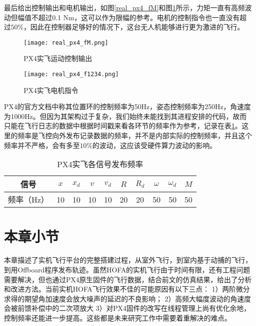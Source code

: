 最后给出控制输出和电机输出，如图\ref{real_px4_fM}和图\ref{real_px4_f1234}所示，力矩一直有高频波动但幅值不超过0.1 Nm，这可以作为限幅的参考。电机的控制指令也一直没有超过$50\%$，因此在控制器足够好的情况下，这台无人机能够进行更为激进的飞行。
\begin{figure}[!h]
  \centering
  \begin{minipage}[b]{0.49\linewidth}
      \texttt{[image: real\_px4\_fM.png]}
      \caption{PX4实飞运动控制输出}
      \label{real_px4_fM}
  \end{minipage}
  \hfill %
  \begin{minipage}[b]{0.49\linewidth}
      \texttt{[image: real\_px4\_f1234.png]}
      \caption{PX4实飞电机指令}
      \label{real_px4_f1234}
  \end{minipage}
\end{figure}


PX4的官方文档中称其位置环的控制频率为50Hz，姿态控制频率为250Hz，角速度为1000Hz\cite{px4}。但因为其架构过于复杂，我们始终未能找到其进程安排的代码，故而只能在飞行日志的数据中根据时间戳来看各环节的频率作为参考，记录在表\ref{频率}。这里的频率是飞控向外发布记录数据的频率，并不是内部实际的控制频率，并且这个频率并不严格，会有多至$10\%$的波动，这应该受硬件算力波动的影响。
\begin{table}[!h]
  \centering
  \caption{PX4实飞各信号发布频率}
  \label{频率}
  \begin{tabular}{cccccccccc}
      \toprule
      信号&$x$ & $x_d$ & $v$ &$v_d$ &$R$ &$R_d$& $\omega$ &$\omega_d$ &$M$\\
      \midrule
频率（Hz）&10& 10& 10& 10& 20&20& 50 & 50&50\\
      \bottomrule
  \end{tabular}
\end{table}


\section{本章小节}
本章描述了实机飞行平台的完整搭建过程，从室外飞行，到室内基于动捕的飞行，到用Offboard程序发布轨迹。虽然HOFA的实机飞行由于时间有限，还有工程问题需要解决，但也通过PX4原生固件的飞行数据，结合前文的仿真结果，给出了分析和改进方法。当前实机HOFA飞行效果不佳的可能原因有以下三点：
1）两阶微分求得的期望角加速度会放大噪声的延迟的不良影响；
2）高频大幅度波动的角速度会被前馈补偿中的二次项放大
3）对PX4固件的改写在线程管理上尚有优化余地，控制频率还能进一步提高。这些都是未来研究工作中需要着重解决的难点。

